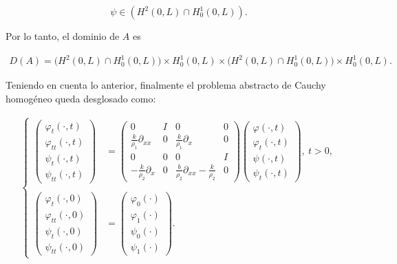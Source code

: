 \[\psi \in \left(H^2(0,L) \cap H_0^1(0,L) \right).\]

Por lo tanto, el dominio de $A$ es

\begin{align}
    \label{DomOperadorATimoBasico}
    D(A) = \Big(H^2(0,L) \cap H_0^1(0,L) \Big) \times H_0^1(0,L) \times \Big(H^2(0,L) \cap H_0^1(0,L) \Big) \times H_0^1(0,L).
\end{align}

Teniendo en cuenta lo anterior, finalmente el problema abstracto de Cauchy homogéneo queda desglosado como:

\begin{align}
    \label{probCauchyHomTimoBasicoDesglosado}
    \begin{cases}
        \begin{pmatrix}
            \varphi_{t}(\cdot, t)\\
            \varphi_{tt}(\cdot, t)\\
            \psi_{t}(\cdot, t)\\
            \psi_{tt}(\cdot, t)
        \end{pmatrix} &= 
        \begin{pmatrix}
        0 & I & 0 & 0\\
        \frac{k}{\rho_1}\partial_{xx} & 0 & \frac{k}{\rho_1}\partial_x & 0\\
        0 & 0 & 0 & I\\
        -\frac{k}{\rho_2}\partial_x & 0 & \frac{b}{\rho_2}\partial_{xx} - \frac{k}{\rho_2} & 0
        \end{pmatrix}
        \begin{pmatrix}
            \varphi(\cdot, t)\\
            \varphi_{t}(\cdot, t)\\
            \psi(\cdot, t)\\
            \psi_{t}(\cdot, t)
        \end{pmatrix}, \ t > 0,\\ \\
        \begin{pmatrix}
            \varphi_{t}(\cdot, 0)\\
            \varphi_{tt}(\cdot, 0)\\
            \psi_{t}(\cdot, 0)\\
            \psi_{tt}(\cdot, 0)
        \end{pmatrix} &=
        \begin{pmatrix}
            \varphi_0(\cdot)\\
            \varphi_1(\cdot)\\
            \psi_0(\cdot)\\
            \psi_1(\cdot)
        \end{pmatrix}.
    \end{cases}
\end{align}

